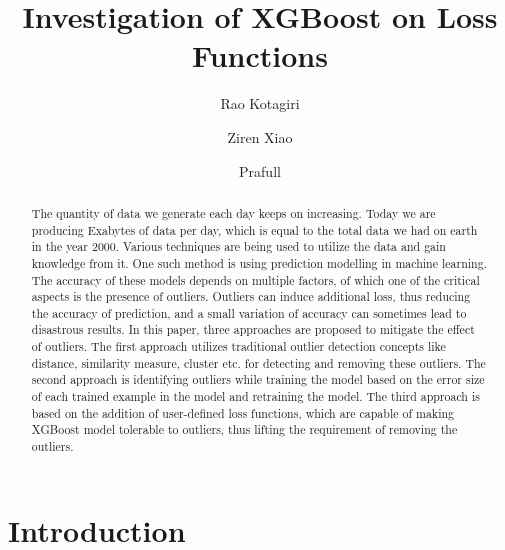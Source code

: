 \documentclass[runningheads]{llncs}
\begin{document}
%
\title{Investigation of XGBoost on Loss Functions }

%
%
\author{Rao Kotagiri \and
Ziren Xiao \and
Prafull}
%
%
%
\maketitle              %
%
\begin{abstract}
The quantity of data we generate each day keeps on increasing. Today we are producing Exabytes of data per day, which is equal to the total data we had on earth in the year 2000. Various techniques are being used to utilize the data and gain knowledge from it. One such method is using prediction modelling in machine learning. The accuracy of these models depends on multiple factors, of which one of the critical aspects is the presence of outliers. Outliers can induce additional loss, thus reducing the accuracy of prediction, and a small variation of accuracy can sometimes lead to disastrous results. In this paper, three approaches are proposed to mitigate the effect of outliers. The first approach utilizes traditional outlier detection concepts like distance, similarity measure, cluster etc. for detecting and removing these outliers. The second approach is identifying outliers while training the model based on the error size of each trained example in the model and retraining the model. The third approach is based on the addition of user-defined loss functions, which are capable of making XGBoost model tolerable to outliers, thus lifting the requirement of removing the outliers. \\
\end{abstract}
%
%
%
\section{Introduction}
\end{document}
